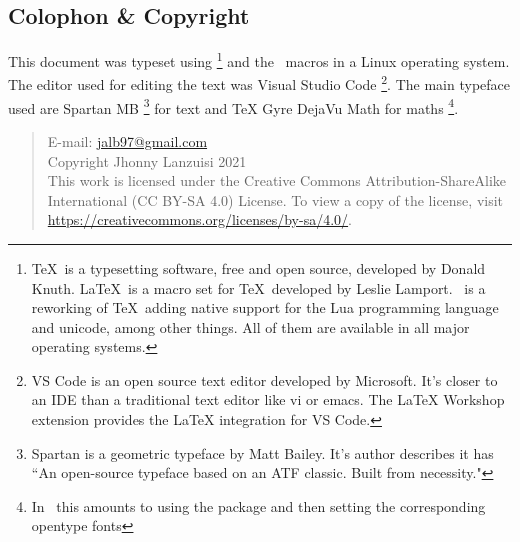 \newpage
\begin{small}
    \begin{center}
    \begin{minipage}{0.4\paperwidth}
        \section*{Colophon \& Copyright}
        This document was typeset using \LuaTeX%
        \footnote{%
            \TeX\ is
            a typesetting software, free and open source,
            developed by Donald Knuth. \LaTeX\ is a macro
            set for \TeX\ developed by Leslie Lamport. \LuaTeX\ is
            a reworking of \TeX\ adding native support for the Lua
            programming language and unicode, among other things.
            All of them are available in all major
            operating systems.
        }
        and the \LaTeXe\ macros in a Linux operating system.
        The editor used for editing the text was Visual Studio Code%
        \footnote{%
            VS Code is an open source text editor
            developed by Microsoft.
            It's closer to an IDE than a traditional text editor
            like vi or emacs.
            The LaTeX Workshop extension provides the LaTeX
            integration for VS Code.
        }.
        The main typeface used are Spartan MB%
        \footnote{%
            Spartan is a geometric typeface
            by Matt Bailey. It's author describes it has
            ``An open-source typeface based on an ATF classic. 
            Built from necessity."
        }
        for text and TeX Gyre DejaVu Math for maths%
        \footnote{%
            In \LuaLaTeX\ this amounts to using the package
            and then setting the corresponding
            opentype fonts
        }.

        \medskip
        \begin{quote}\ttfamily\raggedright
            E-mail: \url{jalb97@gmail.com} \\
            Copyright Jhonny Lanzuisi 2021\\
            This work is licensed under the Creative Commons Attribution-ShareAlike
            International (CC BY-SA 4.0)  License. To view a copy of the license,
            visit \url{https://creativecommons.org/licenses/by-sa/4.0/}.
        \end{quote}
    \end{minipage}
    \end{center}
\end{small}
\newpage
\tableofcontents
